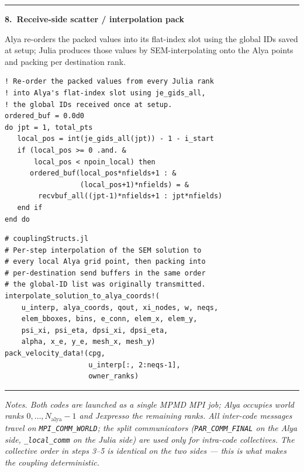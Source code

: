 \documentclass[10pt,landscape]{article}
\newlength{\stepW}\setlength{\stepW}{3.0cm}
\newlength{\codeW}\setlength{\codeW}{10.6cm}
\newcommand{\stepHdr}[1]{%
  \par\medskip
  \noindent\textcolor{ruleC}{\rule{\linewidth}{0.3pt}}\par
  \noindent\textbf{#1}\par\smallskip
}
\begin{document}
\stepHdr{8.\ Receive-side scatter / interpolation pack}
\noindent
\begin{minipage}[t]{\stepW}
\footnotesize Alya re-orders the packed values into its flat-index slot using the global IDs saved at setup; Julia produces those values by SEM-interpolating onto the Alya points and packing per destination rank.
\end{minipage}\hfill
\begin{minipage}[t]{\codeW}
\begin{lstlisting}[style=fortran]
! Re-order the packed values from every Julia rank
! into Alya's flat-index slot using je_gids_all,
! the global IDs received once at setup.
ordered_buf = 0.0d0
do jpt = 1, total_pts
   local_pos = int(je_gids_all(jpt)) - 1 - i_start
   if (local_pos >= 0 .and. &
       local_pos < npoin_local) then
      ordered_buf(local_pos*nfields+1 : &
                  (local_pos+1)*nfields) = &
        recvbuf_all((jpt-1)*nfields+1 : jpt*nfields)
   end if
end do
\end{lstlisting}
\end{minipage}\hfill
\begin{minipage}[t]{\codeW}
\begin{lstlisting}[style=julia]
# couplingStructs.jl
# Per-step interpolation of the SEM solution to
# every local Alya grid point, then packing into
# per-destination send buffers in the same order
# the global-ID list was originally transmitted.
interpolate_solution_to_alya_coords!(
    u_interp, alya_coords, qout, xi_nodes, w, neqs,
    elem_bboxes, bins, e_conn, elem_x, elem_y,
    psi_xi, psi_eta, dpsi_xi, dpsi_eta,
    alpha, x_e, y_e, mesh_x, mesh_y)
pack_velocity_data!(cpg,
                    u_interp[:, 2:neqs-1],
                    owner_ranks)
\end{lstlisting}
\end{minipage}

\par\medskip
\noindent\textcolor{ruleC}{\rule{\linewidth}{0.3pt}}

\vspace{4pt}
{\footnotesize\itshape
Notes.  Both codes are launched as a single MPMD MPI job; Alya occupies
world ranks $0,\ldots,N_{\mathrm{alya}}-1$ and Jexpresso the remaining
ranks. All inter-code messages travel on \texttt{MPI\_COMM\_WORLD}; the
split communicators (\texttt{PAR\_COMM\_FINAL} on the Alya side,
\texttt{\_local\_comm} on the Julia side) are used only for intra-code
collectives. The collective order in steps 3--5 is identical on the two
sides --- this is what makes the coupling deterministic.\par}
\end{document}
